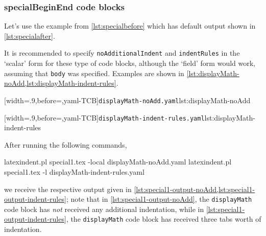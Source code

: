 \subsubsection{specialBeginEnd code blocks}
	Let's use the example from \vref{lst:specialbefore} which has default output shown in
	\vref{lst:specialafter}.

	It is recommended to specify \texttt{noAdditionalIndent} and \texttt{indentRules} in the
	`scalar' form for these type of code blocks, although the `field' form would work,
	assuming that \texttt{body} was specified. Examples are shown in
	\cref{lst:displayMath-noAdd,lst:displayMath-indent-rules}.
	 

	\begin{minipage}{.49\textwidth}
		[width=.9\linewidth,before=\centering,yaml-TCB]{\texttt{displayMath-noAdd.yaml}}{lst:displayMath-noAdd}
	\end{minipage}
	\hfill
	\begin{minipage}{.49\textwidth}
		[width=.9\linewidth,before=\centering,yaml-TCB]{\texttt{displayMath-indent-rules.yaml}}{lst:displayMath-indent-rules}
	\end{minipage}

	After running the following commands, 
	\begin{commandshell}
latexindent.pl special1.tex -local displayMath-noAdd.yaml  
latexindent.pl special1.tex -l displayMath-indent-rules.yaml  
\end{commandshell}
	we receive the respective output given in
	\cref{lst:special1-output-noAdd,lst:special1-output-indent-rules}; note that in
	\cref{lst:special1-output-noAdd}, the \texttt{displayMath} code block has \emph{not}
	received any additional indentation, while in \cref{lst:special1-output-indent-rules},
	the \texttt{displayMath} code block has received three tabs worth of indentation.

	\begin{minipage}{.45\textwidth}
	\end{minipage}
	\hfill
	\begin{minipage}{.45\textwidth}
	\end{minipage}

